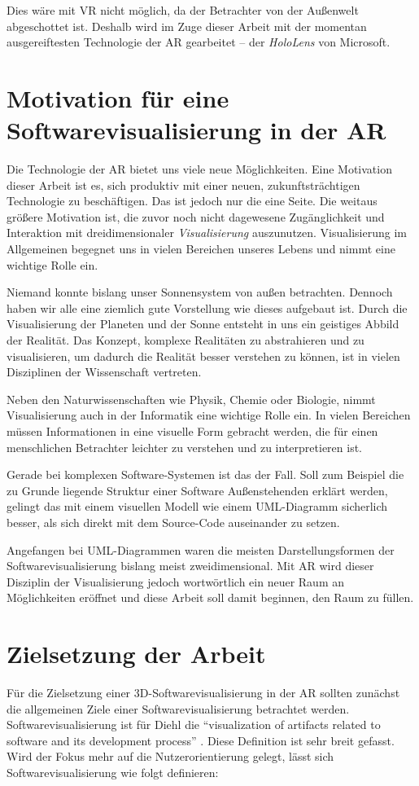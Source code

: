 Dies wäre mit VR nicht möglich, da der Betrachter von der Außenwelt abgeschottet ist. Deshalb wird im Zuge dieser Arbeit mit der momentan ausgereiftesten Technologie der AR gearbeitet -- der \emph{HoloLens} von Microsoft.

\section{Motivation für eine Softwarevisualisierung in der AR}
Die Technologie der AR bietet uns viele neue Möglichkeiten. Eine Motivation dieser Arbeit ist es, sich produktiv mit einer neuen, zukunftsträchtigen Technologie zu beschäftigen. Das ist jedoch nur die eine Seite. Die weitaus größere Motivation ist, die zuvor noch nicht dagewesene Zugänglichkeit und Interaktion mit dreidimensionaler \emph{Visualisierung} auszunutzen. Visualisierung im Allgemeinen begegnet uns in vielen Bereichen unseres Lebens und nimmt eine wichtige Rolle ein.

Niemand konnte bislang unser Sonnensystem von außen betrachten. Dennoch haben wir alle eine ziemlich gute Vorstellung wie dieses aufgebaut ist. Durch die Visualisierung der Planeten und der Sonne entsteht in uns ein geistiges Abbild der Realität. Das Konzept, komplexe Realitäten zu abstrahieren und zu visualisieren, um dadurch die Realität besser verstehen zu können, ist in vielen Disziplinen der Wissenschaft vertreten.

Neben den Naturwissenschaften wie Physik, Chemie oder Biologie, nimmt Visualisierung auch in der Informatik eine wichtige Rolle ein. In vielen Bereichen müssen Informationen in eine visuelle Form gebracht werden, die für einen menschlichen Betrachter leichter zu verstehen und zu interpretieren ist.

Gerade bei komplexen Software-Systemen ist das der Fall. Soll zum Beispiel die zu Grunde liegende Struktur einer Software Außenstehenden erklärt werden, gelingt das mit einem visuellen Modell wie einem UML-Diagramm sicherlich besser, als sich direkt mit dem Source-Code auseinander zu setzen.

Angefangen bei UML-Diagrammen waren die meisten Darstellungsformen der Softwarevisualisierung bislang meist zweidimensional. Mit AR wird dieser Disziplin der Visualisierung jedoch wortwörtlich ein neuer Raum an Möglichkeiten eröffnet und diese Arbeit soll damit beginnen, den Raum zu füllen.

\section{Zielsetzung der Arbeit}
Für die Zielsetzung einer 3D-Softwarevisualisierung in der AR sollten zunächst die allgemeinen Ziele einer Softwarevisualisierung betrachtet werden. Softwarevisualisierung ist für Diehl die "`visualization of artifacts related to software and its development process"' \cite{diehl2007software}. Diese Definition ist sehr breit gefasst. Wird der Fokus mehr auf die Nutzerorientierung gelegt, lässt sich Softwarevisualisierung wie folgt definieren:

